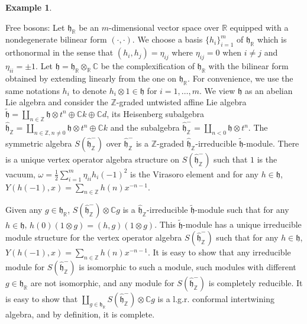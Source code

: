 \documentclass{amsproc}
\theoremstyle{definition}
\newtheorem{expl}[thm]{Example}
\theoremstyle{remark}
\numberwithin{equation}{section}
\begin{document}
\begin{expl}\label{bosons}
{\rm Free bosons: Let $\mathfrak{h}_{\mathbb{R}}$ be an $m$-dimensional 
vector space over
$\mathbb{R}$ equipped with a nondegenerate bilinear form $(\cdot,
\cdot)$. We choose a basis $\{h_{i}\}_{i=1}^{m}$
of $\mathfrak{h}_{\mathbb{R}}$ which is orthonormal
in the sense that $(h_{i}, h_{j})=\eta_{ij}$
 where $\eta_{ij}=0$ when $i\ne j$ and $\eta_{ii}=\pm 1$.
Let $\mathfrak{h}=\mathfrak{h}_{\mathbb{R}}
\otimes_{\mathbb{R}}\mathbb{C}$ be the complexification
of $\mathfrak{h}_{\mathbb{R}}$ with the bilinear
form obtained by extending linearly from the 
one on $\mathfrak{h}_{\mathbb{R}}$.  For convenience, we
use the same notations $h_{i}$ to denote
$h_{i}\otimes 1\in \mathfrak{h}$ for $i=1, \dots, 
m$. We view $\mathfrak{h}$ as an abelian Lie algebra and 
consider the $\mathbb{Z}$-graded
untwisted affine Lie algebra $\tilde{\mathfrak{h}}=\coprod_{n\in \mathbb{Z}}
\mathfrak{h}\otimes t^{n}\oplus \mathbb{C}k\oplus \mathbb{C}d$, its
Heisenberg subalgebra $\hat{\mathfrak{h}}_{\mathbb{Z}}=\coprod_{n\in \mathbb{Z},
n\ne 0}\mathfrak{h}
\otimes t^{n}\oplus \mathbb{C}k$ and the subalgebra 
$\hat{\mathfrak{h}}_{\mathbb{Z}}^{-}=\coprod_{n<0}\mathfrak{h}\otimes t^{n}$.  The
symmetric algebra $S(\hat{\mathfrak{h}}_{\mathbb{Z}}^{-})$ over 
$\hat{\mathfrak{h}}_{\mathbb{Z}}^{-}$ is a $\mathbb{Z}$-graded 
$\hat{\mathfrak{h}}_{\mathbb{Z}}$-irreducible $\tilde{\mathfrak{h}}$-module. 
 There is a unique vertex operator
algebra structure on $S(\hat{\mathfrak{h}}_{\mathbb{Z}}^{-})$ such that 
$1$ is the vacuum, $\omega=\frac{1}{2}\sum_{i=1}^{m}\eta_{ii}h_{i}(-1)^{2}$
is the Virasoro element and for any $h\in \mathfrak{h}$, $Y(h(-1), x)
=\sum_{n\in \mathbb{Z}}h(n)x^{-n-1}$.

Given any $g\in \mathfrak{h}_{\mathbb{R}}$, 
$S(\hat{\mathfrak{h}}_{\mathbb{Z}}^{-})\otimes 
\mathbb{C}g$ is a $\hat{\mathfrak{h}}_{\mathbb{Z}}$-irreducible 
$\tilde{\mathfrak{h}}$-module such that for any $h\in \mathfrak{h}$,
$h(0)(1\otimes g)=(h, g)(1\otimes g)$. This $\tilde{\mathfrak{h}}$-module
has a unique irreducible module structure for the vertex operator algebra
$S(\hat{\mathfrak{h}}_{\mathbb{Z}}^{-})$ such that 
for any $h\in \mathfrak{h}$, $Y(h(-1), x)
=\sum_{n\in \mathbb{Z}}h(n)x^{-n-1}$. It is easy to show that 
any irreducible module for $S(\hat{\mathfrak{h}}_{\mathbb{Z}}^{-})$
is isomorphic to such a module, such modules with different 
$g\in \mathfrak{h}_{\mathbb{R}}$ are not isomorphic, and any module for 
$S(\hat{\mathfrak{h}}_{\mathbb{Z}}^{-})$ is completely reducible. 
It is easy to show that $\coprod_{g\in \mathfrak{h}_{\mathbb{R}}}
S(\hat{\mathfrak{h}}_{\mathbb{Z}}^{-})\otimes 
\mathbb{C}g$ is a l.g.r. conformal intertwining algebra, and by 
definition, it is complete.}
\end{expl}
\end{document}
